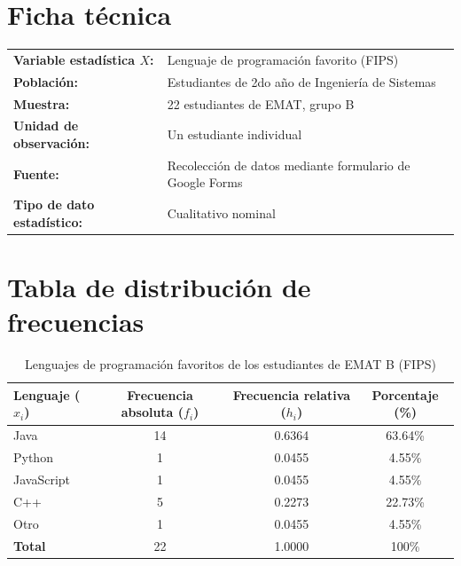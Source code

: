 \documentclass[12pt,letterpaper]{article}
\begin{document}

\section*{Ficha técnica}

\begin{tabularx}{\textwidth}{@{}l X@{}}
\textbf{Variable estadística $X$:} & Lenguaje de programación favorito (FIPS) \\[4pt]
\textbf{Población:} & Estudiantes de 2do año de Ingeniería de Sistemas \\[4pt]
\textbf{Muestra:} & 22 estudiantes de EMAT, grupo B \\[4pt]
\textbf{Unidad de observación:} & Un estudiante individual \\[4pt]
\textbf{Fuente:} & Recolección de datos mediante formulario de Google Forms \\[4pt]
\textbf{Tipo de dato estadístico:} & Cualitativo nominal \\
\end{tabularx}

\vspace{1cm}

\section*{Tabla de distribución de frecuencias}

\begin{table}[H]
    \centering
    \caption{Lenguajes de programación favoritos de los estudiantes de EMAT B (FIPS)}
    \label{tab:lenguajes-favoritos}
    \begin{tabular}{@{}lccc@{}}
        \toprule
        \textbf{Lenguaje ($x_i$)} & \textbf{Frecuencia absoluta ($f_i$)} & \textbf{Frecuencia relativa ($h_i$)} & \textbf{Porcentaje (\%)} \\
        \midrule
        Java        & 14 & 0.6364 & 63.64\% \\
        Python      & 1 & 0.0455 & 4.55\% \\
        JavaScript  & 1 & 0.0455 & 4.55\% \\
        C++         & 5 & 0.2273 & 22.73\% \\
        Otro        & 1 & 0.0455 & 4.55\% \\
        \midrule
        \textbf{Total} & 22 & 1.0000 & 100\% \\
        \bottomrule
    \end{tabular}
\end{table}
\end{document}
